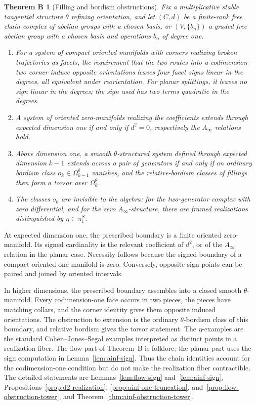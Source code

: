 \documentclass[11pt,letterpaper,twoside]{article}
\theoremstyle{plain}
\newtheorem*{theoremB}{Theorem B}
\theoremstyle{definition}
\theoremstyle{remark}
\newcommand{\Ainf}{A_\infty}
\begin{document}
\begin{theoremB}[Filling and bordism obstructions]
Fix a multiplicative stable tangential structure \(\theta\) refining orientation, and let \((C,d)\) be a finite-rank free chain complex of abelian groups with a chosen basis, or \((V,\{b_n\})\) a graded free abelian group with a chosen basis and operations \(b_n\) of degree one.
\begin{enumerate}
\item For a system of compact oriented manifolds with corners realizing broken trajectories as facets, the requirement that the two routes into a codimension-two corner induce opposite orientations leaves four facet signs linear in the degrees, all equivalent under reorientation.  For planar splittings, it leaves no sign linear in the degrees; the sign used has two terms quadratic in the degrees.
\item A system of oriented zero-manifolds realizing the coefficients extends through expected dimension one if and only if \(d^2=0\), respectively the \(\Ainf\) relations hold.
\item Above dimension one, a smooth \(\theta\)-structured system defined through expected dimension \(k-1\) extends across a pair of generators if and only if an ordinary bordism class \(o_k\in\Omega^\theta_{k-1}\) vanishes, and the relative-bordism classes of fillings then form a torsor over \(\Omega^\theta_k\).
\item The classes \(o_k\) are invisible to the algebra: for the two-generator complex with zero differential, and for the zero \(\Ainf\)-structure, there are framed realizations distinguished by \(\eta\in\pi_1^S\).
\end{enumerate}
\end{theoremB}

At expected dimension one, the prescribed boundary is a finite oriented zero-manifold.  Its signed cardinality is the relevant coefficient of \(d^2\), or of the \(\Ainf\) relation in the planar case.  Necessity follows because the signed boundary of a compact oriented one-manifold is zero.  Conversely, opposite-sign points can be paired and joined by oriented intervals.

In higher dimensions, the prescribed boundary assembles into a closed smooth \(\theta\)-manifold.  Every codimension-one face occurs in two pieces, the pieces have matching collars, and the corner identity gives them opposite induced orientations.  The obstruction to extension is the ordinary \(\theta\)-bordism class of this boundary, and relative bordism gives the torsor statement.  The \(\eta\)-examples are the standard Cohen--Jones--Segal examples interpreted as distinct points in a realization fiber.  The flow part of Theorem~B is folklore; the planar part uses the sign computation in Lemma~\ref{lem:ainf-sign}.  Thus the chain identities account for the codimension-one condition but do not make the realization fiber contractible.  The detailed statements are Lemmas~\ref{lem:flow-sign} and~\ref{lem:ainf-sign}, Propositions~\ref{prop:d2-realization}, \ref{prop:ainf-one-truncation}, and~\ref{prop:flow-obstruction-tower}, and Theorem~\ref{thm:ainf-obstruction-tower}.
\end{document}
